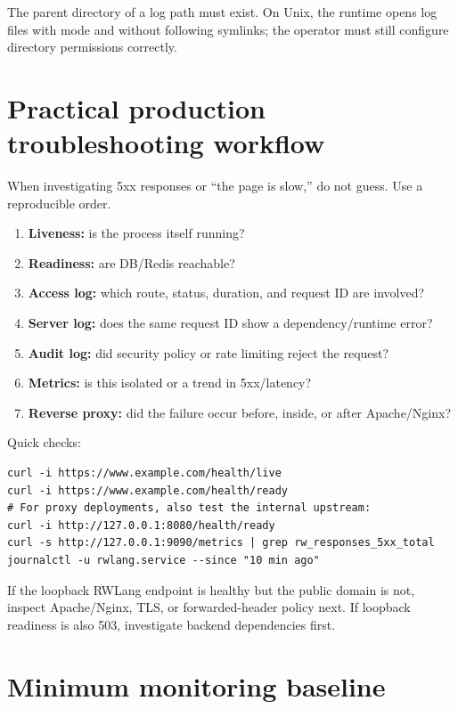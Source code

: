 The parent directory of a log path must exist. On Unix, the runtime opens log files with mode  and without following symlinks; the operator must still configure directory permissions correctly.

\section{Practical production troubleshooting workflow}

When investigating 5xx responses or ``the page is slow,'' do not guess. Use a reproducible order.

\begin{enumerate}
  \item \textbf{Liveness:} is the process itself running?
  \item \textbf{Readiness:} are DB/Redis reachable?
  \item \textbf{Access log:} which route, status, duration, and request ID are involved?
  \item \textbf{Server log:} does the same request ID show a dependency/runtime error?
  \item \textbf{Audit log:} did security policy or rate limiting reject the request?
  \item \textbf{Metrics:} is this isolated or a trend in 5xx/latency?
  \item \textbf{Reverse proxy:} did the failure occur before, inside, or after Apache/Nginx?
\end{enumerate}

Quick checks:

\begin{lstlisting}
curl -i https://www.example.com/health/live
curl -i https://www.example.com/health/ready
# For proxy deployments, also test the internal upstream:
curl -i http://127.0.0.1:8080/health/ready
curl -s http://127.0.0.1:9090/metrics | grep rw_responses_5xx_total
journalctl -u rwlang.service --since "10 min ago"
\end{lstlisting}

If the loopback RWLang endpoint is healthy but the public domain is not, inspect Apache/Nginx, TLS, or forwarded-header policy next. If loopback readiness is also 503, investigate backend dependencies first.

\section{Minimum monitoring baseline}

